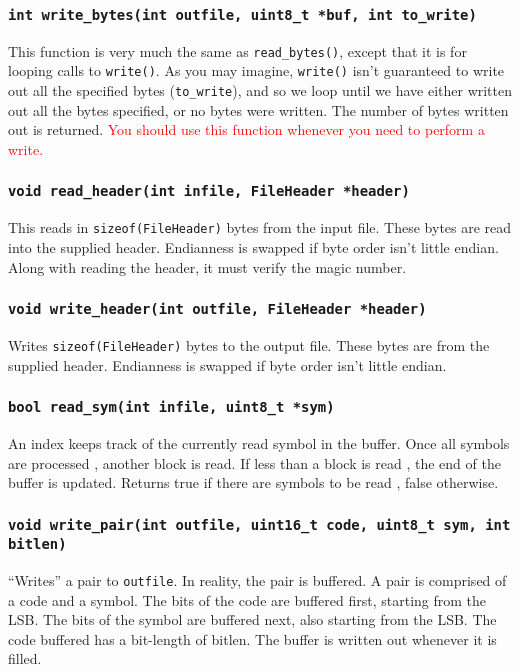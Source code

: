 \documentclass{article}
\begin{document}
\subsubsection{\texttt{int write\_bytes(int outfile, uint8\_t *buf, int
to\_write)}}

This function is very much the same as \texttt{read\_bytes()}, except
that it is for looping calls to \texttt{write()}. As you may imagine,
\texttt{write()} isn't guaranteed to write out all the specified bytes
(\texttt{to\_write}), and so we loop until we have either written out
all the bytes specified, or no bytes were written. The number of bytes
written out is returned.  \textcolor{red}{You should use this function
whenever you need to perform a write.}


\subsubsection{\texttt{void read\_header(int infile, FileHeader *header)}}
This reads in \texttt{sizeof(FileHeader)} bytes from the input file.
These bytes are read into the supplied header. Endianness is swapped if
byte order isn't little endian. Along with reading the header, it must
verify the magic number.

\subsubsection{\texttt{void write\_header(int outfile, FileHeader *header)}}
Writes \texttt{sizeof(FileHeader)} bytes to the output file. These
bytes are from the supplied header. Endianness is swapped if byte order
isn't little endian.

\subsubsection{\texttt{bool read\_sym(int infile, uint8\_t *sym)}}
An index  keeps  track of the  currently  read  symbol  in the  buffer.
Once  all  symbols  are  processed , another  block is read. If less
than a block is read , the end of the  buffer  is  updated.  Returns
true if there  are  symbols  to be read , false  otherwise.

\subsubsection{\texttt{void write\_pair(int outfile, uint16\_t code,
uint8\_t sym, int bitlen)}}
``Writes'' a pair to \texttt{outfile}. In reality, the pair is buffered.
A pair is comprised of a code and a symbol.  The bits of the code are
buffered first, starting from the LSB.  The bits of the symbol are
buffered next, also starting from the LSB.  The code buffered has a
bit-length of bitlen. The buffer is written out whenever it is filled.
\end{document}
